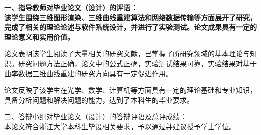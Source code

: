 \clearpage
{}

{
    \bfseries
    \noindent 一、指导教师对毕业论文（设计）的评语：\\

该学生围绕三维图形渲染、三维曲线重建算法和网络数据传输等方面展开了研究，完成了相关的理论论述与软件系统设计，并进行了实验测试。论文成果具有一定的理论意义和实用价值。

论文表明该学生阅读了大量相关的研究文献，已掌握了所研究领域的基本理论与知识。研究问题方法正确，论文中的公式正确，实验测试结果可靠，实验结果对基于曲率数据三维曲线重建的研究方向具有一定促进作用。

论文反映了该学生在光学、数学、计算机等方面具有一定的理论基础和专业知识，具备分析问题和解决问题的能力，达到了本科生的毕业要求。

    \signature{指导教师（签名）}

    \noindent 二、答辩小组对毕业论文（设计）的答辩评语及总评成绩：\\

    本论文符合浙江大学本科生毕设相关要求，予以通过并建议授予学士学位。

    \mbox{} \vfill

    \finaleval[8.1][11.79][3.99][51.33][75]

    \signature{负责人（签名）}
}

